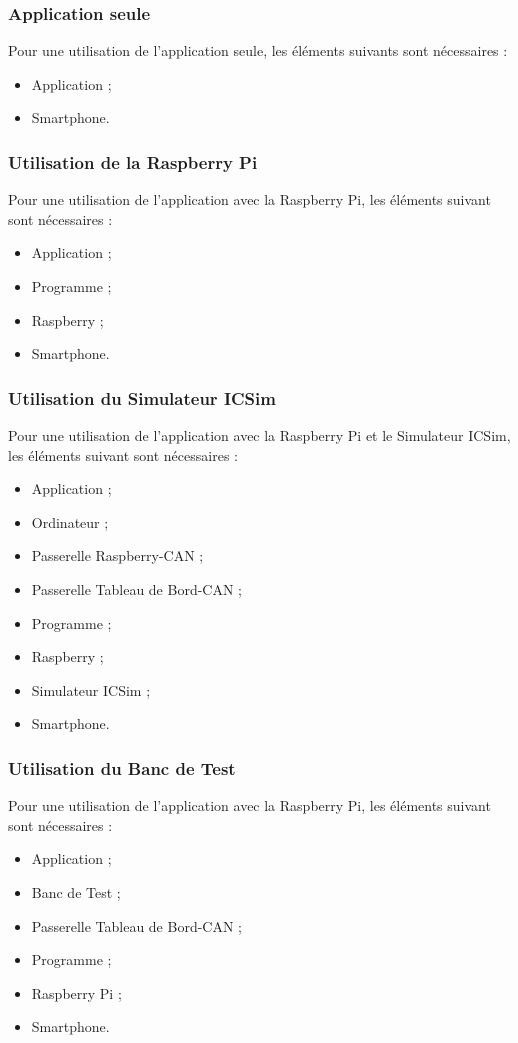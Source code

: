 \subsubsection{Application {\nomApplication} seule}
Pour une utilisation de l'application {\nomApplication} seule, les éléments suivants sont nécessaires :
\begin{itemize}
    \item Application {\nomApplication} ;
    \item Smartphone.
\end{itemize}

\subsubsection{Utilisation de la Raspberry Pi}
Pour une utilisation de l'application {\nomApplication} avec la Raspberry Pi, les éléments suivant sont nécessaires :
\begin{itemize}
    \item Application {\nomApplication} ;
    \item Programme {\nomLogiciel} ;
    \item Raspberry ;
    \item Smartphone.
\end{itemize}

\subsubsection{Utilisation du Simulateur ICSim}
Pour une utilisation de l'application {\nomApplication} avec la Raspberry Pi et le Simulateur ICSim, les éléments suivant sont nécessaires :
\begin{itemize}
    \item Application {\nomApplication} ;
    \item Ordinateur ;
    \item Passerelle Raspberry-CAN ;
    \item Passerelle Tableau de Bord-CAN ;
    \item Programme {\nomLogiciel} ;
    \item Raspberry ;
    \item Simulateur ICSim ;
    \item Smartphone.
\end{itemize}

\subsubsection{Utilisation du Banc de Test}
Pour une utilisation de l'application {\nomApplication} avec la Raspberry Pi, les éléments suivant sont nécessaires :
\begin{itemize}
    \item Application {\nomApplication} ;
    \item Banc de Test ;
    \item Passerelle Tableau de Bord-CAN ;
    \item Programme {\nomLogiciel} ;
    \item Raspberry Pi ;
    \item Smartphone.
\end{itemize}

